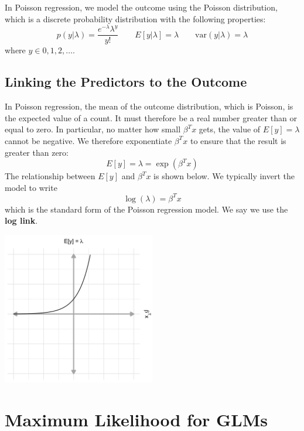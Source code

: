In Poisson regression, we model the outcome using the Poisson distribution, which is a discrete probability distribution with the following properties:
$$ p(y | \lambda) = \frac{e^{-\lambda} \lambda^y}{y!} \qquad E[y|\lambda] = \lambda \qquad \text{var}(y|\lambda) = \lambda $$
where $y \in 0, 1, 2, \dots$.

\subsection{Linking the Predictors to the Outcome}

In Poisson regression, the mean of the outcome distribution, which is Poisson, is the expected value of a count. It must therefore be a real number greater than or equal to zero. In particular, no matter how small $\beta^T x$ gets, the value of $E[y] = \lambda$ cannot be negative. We therefore exponentiate $\beta^T x$ to ensure that the result is greater than zero:
\begin{equation} E[y] = \lambda = \exp(\beta^T x) \label{eqn:meanpoisson} \end{equation}
The relationship between $E[y]$ and $\beta^T x$ is shown below. We typically invert the model to write
$$ \log(\lambda) = \beta^T x $$
which is the standard form of the Poisson regression model. We say we use the \textbf{log link}. 

\begin{center}
\includegraphics[width=0.5\textwidth]{img/l02-figure3-poisson.png}
\end{center}


\section{Maximum Likelihood for GLMs}

